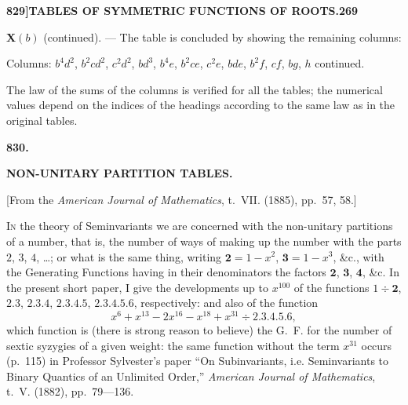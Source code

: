 \documentclass[11pt,a4paper]{book}
\begin{document}
\newpage
\setcounter{page}{269}

\noindent\textbf{829]}\hfill\textbf{TABLES OF SYMMETRIC FUNCTIONS OF ROOTS.}\hfill\textbf{269}

\bigskip

\noindent\textbf{X$(b)$} (continued). --- The table is concluded by showing the remaining columns:

\medskip

\noindent Columns: $b^4d^2$, $b^2cd^2$, $c^2d^2$, $bd^3$, $b^4e$, $b^2ce$, $c^2e$, $bde$, $b^2f$, $cf$, $bg$, $h$ continued.

\medskip


\medskip

\noindent The law of the sums of the columns is verified for all the tables; the numerical values depend on the indices of the headings according to the same law as in the original tables.

\newpage
\setcounter{page}{273}


\begin{center}
\Large\textbf{830.}

\bigskip

\Large\textbf{NON-UNITARY PARTITION TABLES.}
\end{center}

\begin{center}
[From the \textit{American Journal of Mathematics}, t.~VII. (1885), pp.~57, 58.]
\end{center}

\noindent\textsc{In} the theory of Seminvariants we are concerned with the non-unitary partitions of a number, that is, the number of ways of making up the number with the parts $2$, $3$, $4$, \dots; or what is the same thing, writing $\mathbf{2} = 1 - x^2$, $\mathbf{3} = 1 - x^3$, \&c., with the Generating Functions having in their denominators the factors $\mathbf{2}$, $\mathbf{3}$, $\mathbf{4}$, \&c. In the present short paper, I give the developments up to $x^{100}$ of the functions $1 \div \mathbf{2}$, $\mathbf{2.3}$, $\mathbf{2.3.4}$, $\mathbf{2.3.4.5}$, $\mathbf{2.3.4.5.6}$, respectively: and also of the function
\[
x^6 + x^{13} - 2x^{16} - x^{18} + x^{31} \div \mathbf{2.3.4.5.6},
\]
which function is (there is strong reason to believe) the G.~F. for the number of sextic syzygies of a given weight: the same function without the term $x^{31}$ occurs (p.~115) in Professor Sylvester's paper ``On Subinvariants, i.e. Seminvariants to Binary Quantics of an Unlimited Order,'' \textit{American Journal of Mathematics}, t.~V. (1882), pp.~79---136.
\end{document}
